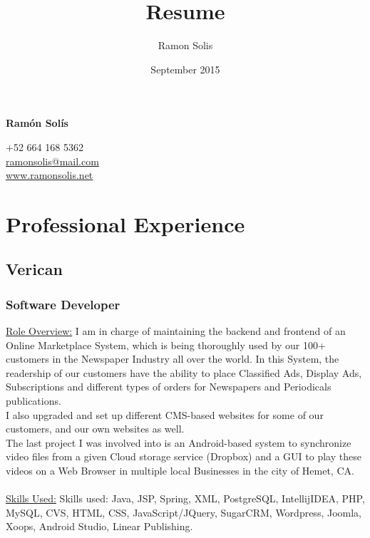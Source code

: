 \documentclass[letterpaper, 11pt]{article}
\title{Resume}
\author{Ramon Solis}
\date{September 2015}
\begin{document}
	\begin{flushright}
		{\Huge{\textbf{Ramón Solís}}}\\
		\begin{large}
		+52 664 168 5362\\
		\href{mailto:ramonsolis@mail.com}{ramonsolis@mail.com}\\
		\href{http://www.ramonsolis.net}{www.ramonsolis.net}\\
		\end{large}
	\end{flushright}
	\section*{\huge{Professional Experience}}
	\noindent\makebox[\linewidth]{\rule{\textwidth}{0.5pt}} 
	\subsection*{\LARGE{\textbf{Verican}}}
	\subsubsection*{Software Developer}
	\underline{Role Overview:} 
	I am in charge of maintaining the backend and frontend of an Online Marketplace System, which is being thoroughly used by our 100+ customers in the Newspaper Industry all over the world. In this System, the readership of our customers have the ability to place Classified Ads, Display Ads, Subscriptions and different types of orders for Newspapers and Periodicals publications.\\

I also upgraded and set up different CMS-based websites for some of our customers, and our own websites as well.\\

The last project I was involved into is an Android-based system to synchronize video files from a given Cloud storage service (Dropbox) and a GUI to play these videos on a Web Browser in multiple local  Businesses in the city of Hemet, CA.\\\\
	\underline{Skills Used:}
	Skills used: Java, JSP, Spring, XML, PostgreSQL, IntellijIDEA, PHP, MySQL, CVS, HTML, CSS, JavaScript/JQuery, SugarCRM, Wordpress, Joomla, Xoops, Android Studio, Linear Publishing.
\end{document}

